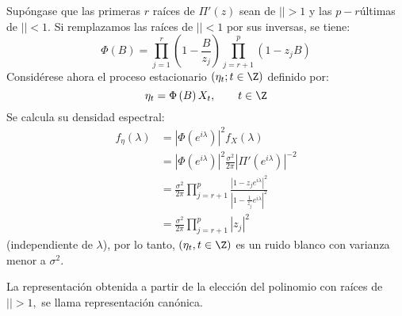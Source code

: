 \begin{observacion}
\begin{enumerate}
Sup\'{o}ngase que las primeras $r$ ra\'{i}ces de $\Pi'(z)$ sean de $\left| \right|>1$ y las $p-r $\'{u}ltimas de $\left| \right|<1$. Si remplazamos las ra\'{i}ces de $\left| \right|<1$ por sus inversas, se tiene: 
\[
\Phi (B)=\prod_{j=1}^{r} \left( {1-\frac{B}{z_{j} }} 
\right)\prod_{j=r+1}^{p} \left( {1-z_{j} B} \right)
\]
Consid\'{e}rese ahora el proceso estacionario $\left( {\eta_{t} ;t\in \Z} \right)$ definido por:
\[
\eta_{t} =\Phi \left( B \right)X_{t}, \qquad t\in \Z
\]
Se calcula su densidad espectral: 
\begin{align*}
 f_{\eta } (\lambda )
	&=\left| {\Phi \left( {e^{i\lambda }} \right)} \right|^{2}f_{X} (\lambda )\\
	&=\left| {\Phi \left( {e^{i\lambda }} \right)} \right|^{2}\frac{\sigma^{2}}{2\pi}\left| {\Pi'\left( {e^{i\lambda }} \right)} \right|^{-2}\\
	&=\frac{\sigma^{2}}{2\pi }\prod_{j=r+1}^{p} \frac{\left| {1-z_{j} e^{i\lambda }} \right|^{2}}{\left| {1-\frac{1}{z_{j} }e^{i\lambda }} \right|^{2}}\\
	&=\frac{\sigma^{2}}{2\pi }\prod_{j=r+1}^{p} \left| {z_{j} } \right|^{2}
\end{align*}
(independiente de $\lambda$), por lo tanto, $\left( {\eta_{t},t\in \Z} \right)$ es un ruido blanco con varianza menor a $\sigma^{2}$.\newline

La representaci\'{o}n obtenida a partir de la elecci\'{o}n del polinomio con ra\'{i}ces de $\left| \right|>1,$ se llama representaci\'{o}n can\'{o}nica.
\end{enumerate}
\end{observacion}


